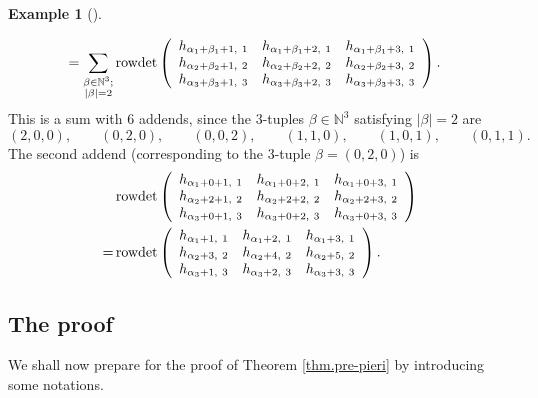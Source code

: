 \documentclass[numbers=enddot,12pt,final,onecolumn,notitlepage,english]{scrartcl}%
\theoremstyle{definition}
\newtheorem{exam}[theo]{Example}
\newenvironment{example}[1][]
{\begin{exam}[#1]\begin{leftbar}}
{\end{leftbar}\end{exam}}
\let\sumnonlimits\sum
\renewcommand{\sum}{\sumnonlimits\limits}
\newenvironment{verlong}{}{}
\begin{document}
\begin{verlong}
\begin{example}
\begin{align*}
&  =\sum_{\substack{\beta\in\mathbb{N}^{3};\\\left\vert \beta\right\vert
=2}}\operatorname*{rowdet}\left(
\begin{array}
[c]{ccc}%
h_{\alpha_{1}+\beta_{1}+1,\ 1} & h_{\alpha_{1}+\beta_{1}+2,\ 1} &
h_{\alpha_{1}+\beta_{1}+3,\ 1}\\
h_{\alpha_{2}+\beta_{2}+1,\ 2} & h_{\alpha_{2}+\beta_{2}+2,\ 2} &
h_{\alpha_{2}+\beta_{2}+3,\ 2}\\
h_{\alpha_{3}+\beta_{3}+1,\ 3} & h_{\alpha_{3}+\beta_{3}+2,\ 3} &
h_{\alpha_{3}+\beta_{3}+3,\ 3}%
\end{array}
\right)  .
\end{align*}
This is a sum with $6$ addends, since the $3$-tuples $\beta\in\mathbb{N}^{3}$
satisfying $\left\vert \beta\right\vert =2$ are
\[
\left(  2,0,0\right)  ,\qquad\left(  0,2,0\right)  ,\qquad\left(
0,0,2\right)  ,\qquad\left(  1,1,0\right)  ,\qquad\left(  1,0,1\right)
,\qquad\left(  0,1,1\right)  .
\]
The second addend (corresponding to the $3$-tuple $\beta=\left(  0,2,0\right)
$) is%
\begin{align*}
&  \operatorname*{rowdet}\left(
\begin{array}
[c]{ccc}%
h_{\alpha_{1}+0+1,\ 1} & h_{\alpha_{1}+0+2,\ 1} & h_{\alpha_{1}+0+3,\ 1}\\
h_{\alpha_{2}+2+1,\ 2} & h_{\alpha_{2}+2+2,\ 2} & h_{\alpha_{2}+2+3,\ 2}\\
h_{\alpha_{3}+0+1,\ 3} & h_{\alpha_{3}+0+2,\ 3} & h_{\alpha_{3}+0+3,\ 3}%
\end{array}
\right) \\
=  &  \operatorname*{rowdet}\left(
\begin{array}
[c]{ccc}%
h_{\alpha_{1}+1,\ 1} & h_{\alpha_{1}+2,\ 1} & h_{\alpha_{1}+3,\ 1}\\
h_{\alpha_{2}+3,\ 2} & h_{\alpha_{2}+4,\ 2} & h_{\alpha_{2}+5,\ 2}\\
h_{\alpha_{3}+1,\ 3} & h_{\alpha_{3}+2,\ 3} & h_{\alpha_{3}+3,\ 3}%
\end{array}
\right)  .
\end{align*}

\end{example}
\end{verlong}

\subsection{The proof}

We shall now prepare for the proof of Theorem \ref{thm.pre-pieri} by
introducing some notations.
\end{document}
